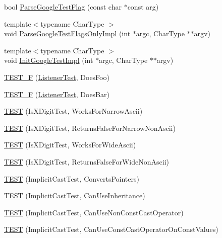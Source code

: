 \begin{DoxyCompactItemize}
\item 
bool \hyperlink{namespacetesting_1_1internal_afccff08aa2b1ede0dd32c1364a5dee42}{Parse\+Google\+Test\+Flag} (const char $\ast$const arg)
\item 
{\footnotesize template$<$typename Char\+Type $>$ }\\void \hyperlink{namespacetesting_1_1internal_ae4c46ce8c3d016848fff52cc5133f2ac}{Parse\+Google\+Test\+Flags\+Only\+Impl} (int $\ast$argc, Char\+Type $\ast$$\ast$argv)
\item 
{\footnotesize template$<$typename Char\+Type $>$ }\\void \hyperlink{namespacetesting_1_1internal_ac3c6fa93391768aa91c6238b31aaeeb5}{Init\+Google\+Test\+Impl} (int $\ast$argc, Char\+Type $\ast$$\ast$argv)
\item 
\hyperlink{namespacetesting_1_1internal_a7e113e9c70d45d89fe1703e58ff083b9}{T\+E\+S\+T\+\_\+F} (\hyperlink{classtesting_1_1internal_1_1ListenerTest}{Listener\+Test}, Does\+Foo)
\item 
\hyperlink{namespacetesting_1_1internal_a02cef32090020d164460dd3d9f8e2852}{T\+E\+S\+T\+\_\+F} (\hyperlink{classtesting_1_1internal_1_1ListenerTest}{Listener\+Test}, Does\+Bar)
\item 
\hyperlink{namespacetesting_1_1internal_a0c1e055c001e4dbb874f00a46c25bb00}{T\+E\+ST} (Is\+X\+Digit\+Test, Works\+For\+Narrow\+Ascii)
\item 
\hyperlink{namespacetesting_1_1internal_a7cd9d67d4164d2aeb4ceb3ed253c7d2d}{T\+E\+ST} (Is\+X\+Digit\+Test, Returns\+False\+For\+Narrow\+Non\+Ascii)
\item 
\hyperlink{namespacetesting_1_1internal_af76bca685fddffc0ecda1464b1b6a0a4}{T\+E\+ST} (Is\+X\+Digit\+Test, Works\+For\+Wide\+Ascii)
\item 
\hyperlink{namespacetesting_1_1internal_a771232ed3801fa49cbd4bbe11b318fe3}{T\+E\+ST} (Is\+X\+Digit\+Test, Returns\+False\+For\+Wide\+Non\+Ascii)
\item 
\hyperlink{namespacetesting_1_1internal_a5d2ec1128c80363b06070f403f682490}{T\+E\+ST} (Implicit\+Cast\+Test, Converts\+Pointers)
\item 
\hyperlink{namespacetesting_1_1internal_a1b304dcd3ac71095f2e7d9e9b43c4755}{T\+E\+ST} (Implicit\+Cast\+Test, Can\+Use\+Inheritance)
\item 
\hyperlink{namespacetesting_1_1internal_a8554484c7c0ea536bc393c254490aaff}{T\+E\+ST} (Implicit\+Cast\+Test, Can\+Use\+Non\+Const\+Cast\+Operator)
\item 
\hyperlink{namespacetesting_1_1internal_af7f631f9fbde27b19a65d50fc29e1420}{T\+E\+ST} (Implicit\+Cast\+Test, Can\+Use\+Const\+Cast\+Operator\+On\+Const\+Values)

\end{DoxyCompactItemize}
